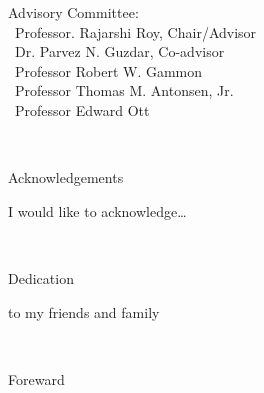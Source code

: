\documentclass[%
	12pt,
		oneside,
		letterpaper
]{book}
\begin{document}
\vspace{7.5em}

\noindent Advisory Committee: \\
\hbox{\ }\hspace{.5in}Professor. Rajarshi Roy, Chair/Advisor \\
\hbox{\ }\hspace{.5in}Dr. Parvez N. Guzdar, Co-advisor \\
\hbox{\ }\hspace{.5in}Professor Robert W. Gammon \\
\hbox{\ }\hspace{.5in}Professor Thomas M. Antonsen, Jr. \\
\hbox{\ }\hspace{.5in}Professor Edward Ott \\
 

\pagestyle{plain}  \setcounter{page}{2}



\clearpage
{} %
\small\normalsize
\hbox{\ }
 
\vspace{.5in}

\begin{center}
\large{Acknowledgements} 
\end{center} 

\vspace{1ex}

I would like to acknowledge\ldots{}
\clearpage
{} %
\small\normalsize
\hbox{\ }
 
\vspace{.5in}

\begin{center}
\large{Dedication} 
\end{center} 

\vspace{1ex}

to my friends and family
\clearpage
{} %
\small\normalsize
\hbox{\ }
 
\vspace{.5in}

\begin{center}
\large{Foreward} 
\end{center} 
\end{document}
